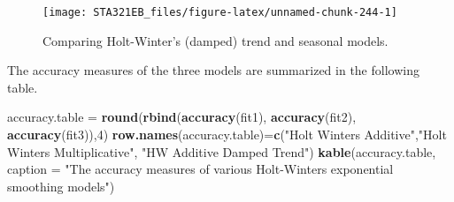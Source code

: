 \documentclass[
]{book}
\newenvironment{Shaded}{\begin{snugshade}}{\end{snugshade}}
\newcommand{\AttributeTok}[1]{\textcolor[rgb]{0.13,0.29,0.53}{#1}}
\newcommand{\DecValTok}[1]{\textcolor[rgb]{0.00,0.00,0.81}{#1}}
\newcommand{\DocumentationTok}[1]{\textcolor[rgb]{0.56,0.35,0.01}{\textbf{\textit{#1}}}}
\newcommand{\FloatTok}[1]{\textcolor[rgb]{0.00,0.00,0.81}{#1}}
\newcommand{\FunctionTok}[1]{\textcolor[rgb]{0.13,0.29,0.53}{\textbf{#1}}}
\newcommand{\NormalTok}[1]{#1}
\newcommand{\OtherTok}[1]{\textcolor[rgb]{0.56,0.35,0.01}{#1}}
\newcommand{\SpecialCharTok}[1]{\textcolor[rgb]{0.81,0.36,0.00}{\textbf{#1}}}
\newcommand{\StringTok}[1]{\textcolor[rgb]{0.31,0.60,0.02}{#1}}
\begin{document}
\begin{Shaded}
\end{Shaded}

\begin{figure}

{\centering \texttt{[image: STA321EB\_files/figure-latex/unnamed-chunk-244-1]} 

}

\caption{ Comparing Holt-Winter's (damped) trend and seasonal models.}\label{fig:unnamed-chunk-244}
\end{figure}

The accuracy measures of the three models are summarized in the following table.

\begin{Shaded}
\begin{Highlighting}[]
\NormalTok{accuracy.table }\OtherTok{=} \FunctionTok{round}\NormalTok{(}\FunctionTok{rbind}\NormalTok{(}\FunctionTok{accuracy}\NormalTok{(fit1), }\FunctionTok{accuracy}\NormalTok{(fit2), }\FunctionTok{accuracy}\NormalTok{(fit3)),}\DecValTok{4}\NormalTok{)}
\FunctionTok{row.names}\NormalTok{(accuracy.table)}\OtherTok{=}\FunctionTok{c}\NormalTok{(}\StringTok{"Holt Winters\textquotesingle{} Additive"}\NormalTok{,}\StringTok{"Holt Winters\textquotesingle{} Multiplicative"}\NormalTok{,}
    \StringTok{"HW Additive Damped Trend"}\NormalTok{)}
\FunctionTok{kable}\NormalTok{(accuracy.table, }\AttributeTok{caption =} \StringTok{"The accuracy measures of various Holt{-}Winter\textquotesingle{}s }
\StringTok{        exponential smoothing models"}\NormalTok{)}
\end{Highlighting}
\end{Shaded}
\end{document}
